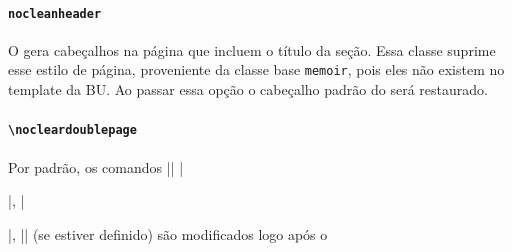 \documentclass[embeddedlogo]{../ufsc-thesis-rn46-2019}
\begin{document}
\paragraph*{\texttt{nocleanheader}} O \abnTeX{} gera cabeçalhos na página que
incluem o título da seção. Essa classe suprime esse estilo de página,
proveniente da classe base \texttt{memoir}, pois eles não existem no template
da BU. Ao passar essa opção o cabeçalho padrão do \abnTeX{} será restaurado.

\paragraph*{\texttt{\textbackslash{}nocleardoublepage}} Por padrão, os comandos
\mt|\tableofcontents| \mt|\listoftables|, \mt|\listoffigures|,
\mt|\listoflistings| (se estiver definido) são modificados logo após o
\end{document}
